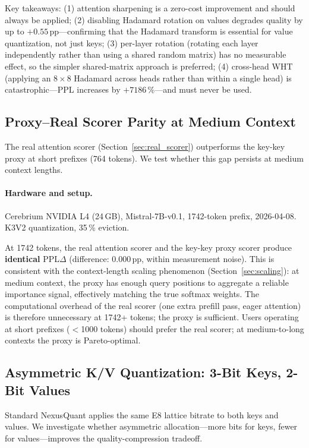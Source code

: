 \documentclass{article}
\begin{document}
Key takeaways: (1) attention sharpening is a zero-cost improvement and should
always be applied; (2) disabling Hadamard rotation on values degrades quality
by up to $+0.55$\,pp---confirming that the Hadamard transform is essential for
value quantization, not just keys; (3) per-layer rotation (rotating each layer
independently rather than using a shared random matrix) has no measurable effect,
so the simpler shared-matrix approach is preferred; (4) cross-head WHT (applying
an $8{\times}8$ Hadamard across heads rather than within a single head) is
catastrophic---PPL increases by $+7186$\,\%---and must never be used.

\subsection{Proxy--Real Scorer Parity at Medium Context}
\label{sec:proxy_parity}

The real attention scorer (Section~\ref{sec:real_scorer}) outperforms the
key-key proxy at short prefixes (764 tokens).  We test whether this gap persists
at medium context lengths.

\paragraph{Hardware and setup.}
Cerebrium NVIDIA L4 (24\,GB), Mistral-7B-v0.1, 1742-token prefix, 2026-04-08.
K3V2 quantization, 35\,\% eviction.

At 1742 tokens, the real attention scorer and the key-key proxy scorer produce
\textbf{identical} PPL$\Delta$ (difference: 0.000\,pp, within measurement noise).
This is consistent with the context-length scaling phenomenon
(Section~\ref{sec:scaling}): at medium context, the proxy has enough query
positions to aggregate a reliable importance signal, effectively matching the
true softmax weights.  The computational overhead of the real scorer (one extra
prefill pass, eager attention) is therefore unnecessary at 1742+ tokens; the
proxy is sufficient.  Users operating at short prefixes ($<$1000 tokens) should
prefer the real scorer; at medium-to-long contexts the proxy is Pareto-optimal.

\subsection{Asymmetric K/V Quantization: 3-Bit Keys, 2-Bit Values}
\label{sec:asymmetric}

Standard NexusQuant applies the same E8 lattice bitrate to both keys and values.
We investigate whether asymmetric allocation---more bits for keys, fewer for
values---improves the quality-compression tradeoff.
\end{document}
